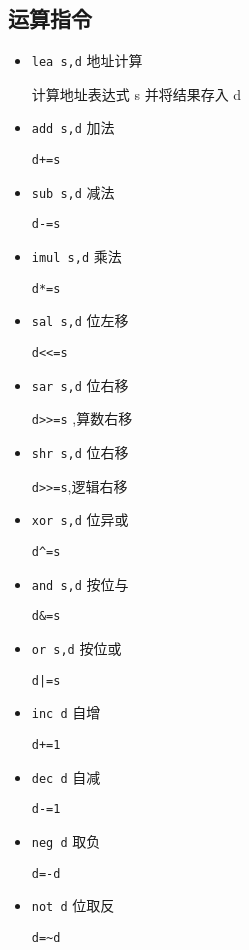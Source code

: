         \subsection{运算指令}
        \begin{itemize}
            \item \texttt{lea   s,d} 地址计算

                计算地址表达式 s 并将结果存入 d
            \item \texttt{add   s,d} 加法

                \texttt{d+=s}
            \item \texttt{sub   s,d} 减法

                \texttt{d-=s}
            \item \texttt{imul   s,d} 乘法

                \texttt{d*=s}
            \item \texttt{sal    s,d} 位左移

                \texttt{d<<=s}
            \item \texttt{sar    s,d} 位右移

                \texttt{d>>=s} ,算数右移
            \item \texttt{shr    s,d} 位右移

                \texttt{d>>=s},逻辑右移
            \item \texttt{xor   s,d} 位异或

                \texttt{d\^{}=s}
            \item \texttt{and   s,d} 按位与

                \texttt{d\&=s}
            \item \texttt{or    s,d} 按位或

                \texttt{d|=s}
            \item \texttt{inc    d} 自增

                \texttt{d+=1}
            \item \texttt{dec   d} 自减

                \texttt{d-=1}
            \item \texttt{neg   d} 取负

                \texttt{d=-d}
            \item \texttt{not   d} 位取反

                \texttt{d=\~{}d}
        \end{itemize}
